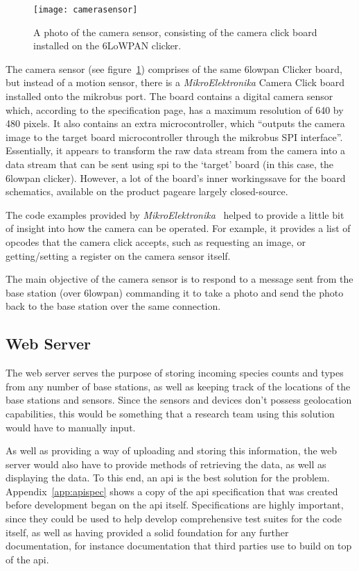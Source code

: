 \begin{figure}
  \centering
  \texttt{[image: camerasensor]}
  \caption{A photo of the camera sensor, consisting of the camera click board
  installed on the 6LoWPAN clicker.}
  \label{fig:camerasensor}
\end{figure}
The camera sensor (see figure~\ref{fig:camerasensor}) comprises of the same
\gls{6lowpan} Clicker board, but instead of a motion sensor, there is a
\textit{MikroElektronika} Camera Click board~\cite{cameraclick} installed
onto the \gls{mikrobus} port. The board contains a digital camera sensor
which, according to the specification page, has a maximum resolution of 640
by 480 pixels. It also contains an extra microcontroller, which ``outputs the
camera image to the target board microcontroller through the \gls{mikrobus}
SPI interface''. Essentially, it appears to transform the raw data stream
from the camera into a data stream that can be sent using \acrfull{spi} to
the `target' board (in this case, the \gls{6lowpan} clicker). However, a lot
of the board's inner workings\textemdash{}save for the board schematics,
available on the product page\textemdash{}are largely closed-source.

The code examples provided by
\textit{MikroElektronika}~\cite{cameraclickexamples} helped to provide a
little bit of insight into how the camera can be operated. For example, it
provides a list of \glspl{opcode} that the camera click accepts, such as
requesting an image, or getting/setting a register on the camera sensor
itself.

The main objective of the camera sensor is to respond to a message sent from
the base station (over \gls{6lowpan}) commanding it to take a photo and send
the photo back to the base station over the same connection.

\subsection{Web Server}
The web server serves the purpose of storing incoming species counts and
types from any number of base stations, as well as keeping track of the
locations of the base stations and sensors. Since the sensors and devices
don't possess geolocation capabilities, this would be something that a
research team using this solution would have to manually input.

As well as providing a way of uploading and storing this information, the web
server would also have to provide methods of retrieving the data, as well as
displaying the data. To this end, an \acrshort{api} is the best solution for
the problem. Appendix~\ref{app:apispec} shows a copy of the \acrshort{api}
specification that was created before development began on the \acrshort{api}
itself. Specifications are highly important, since they could be used to help
develop comprehensive test suites for the code itself, as well as having
provided a solid foundation for any further documentation, for instance
documentation that third parties use to build on top of the \acrshort{api}.

